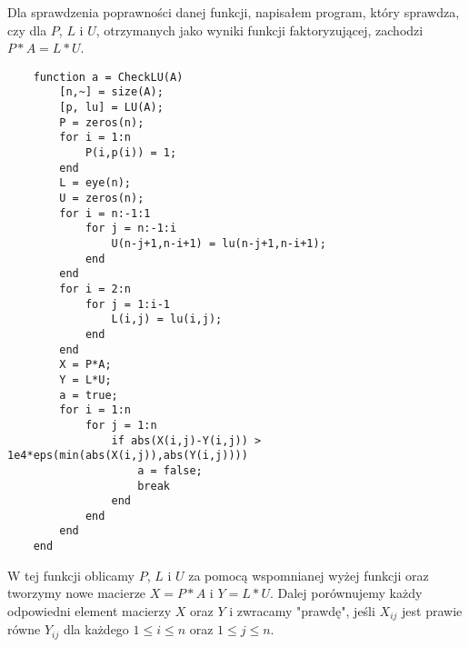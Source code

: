 \documentclass[12pt,a4paper]{article}
\begin{document}
  Dla sprawdzenia poprawności danej funkcji, napisałem program, który sprawdza, czy
  dla $P$, $L$ i $U$, otrzymanych jako wyniki funkcji faktoryzującej, zachodzi
  $P*A=L*U$.
\begin{Verbatim}
    function a = CheckLU(A)
        [n,~] = size(A);
        [p, lu] = LU(A);
        P = zeros(n);
        for i = 1:n
            P(i,p(i)) = 1;
        end
        L = eye(n);
        U = zeros(n);
        for i = n:-1:1
            for j = n:-1:i
                U(n-j+1,n-i+1) = lu(n-j+1,n-i+1);
            end
        end
        for i = 2:n
            for j = 1:i-1
                L(i,j) = lu(i,j);
            end
        end
        X = P*A;
        Y = L*U;
        a = true;
        for i = 1:n
            for j = 1:n
                if abs(X(i,j)-Y(i,j)) > 1e4*eps(min(abs(X(i,j)),abs(Y(i,j))))
                    a = false;
                    break
                end
            end
        end
    end
\end{Verbatim}
W tej funkcji oblicamy $P$, $L$ i $U$ za pomocą wspomnianej wyżej funkcji oraz
tworzymy nowe macierze $X=P*A$ i $Y=L*U$. Dalej porównujemy każdy odpowiedni element
macierzy $X$ oraz $Y$ i zwracamy "prawdę", jeśli $X_{ij}$ jest prawie równe
$Y_{ij}$ dla każdego $1 \leq i \leq n$ oraz $1 \leq j \leq n$.
\end{document}
